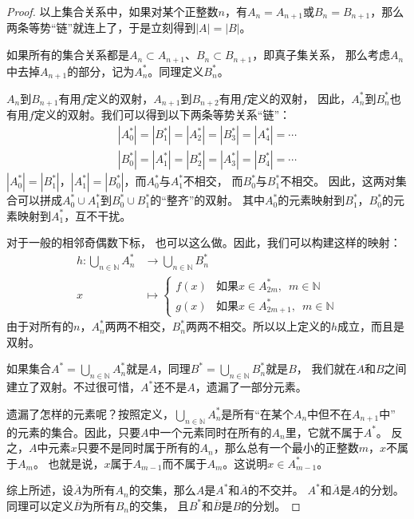 \documentclass[12pt,UTF8]{ctexbook}
\begin{document}
\begin{appendix}
\begin{proof}
    以上集合关系中，如果对某个正整数$n$，有$A_n = A_{n+1}$或$B_n = B_{n+1}$，那么两条等势“链”就连上了，于是立刻得到$|A| = |B|$。

    如果所有的集合关系都是$A_n \subset A_{n+1}$、$B_n \subset B_{n+1}$，即真子集关系，
    那么考虑$A_n$中去掉$A_{n+1}$的部分，记为$A_n^*$。同理定义$B_n^*$。
    
    $A_n$到$B_{n+1}$有用$f$定义的双射，$A_{n+1}$到$B_{n+2}$有用$f$定义的双射，
    因此，$A_n^*$到$B_n^*$也有用$f$定义的双射。我们可以得到以下两条等势关系“链”：
    \begin{align*}
        |A_0^*| = |B_1^*| = |A_2^*| = |B_3^*| = |A_4^*| = \cdots  \\
        |B_0^*| = |A_1^*| = |B_2^*| = |A_3^*| = |B_4^*| = \cdots   
    \end{align*}
    $|A_0^*| = |B_1^*|$，$|A_1^*| = |B_0^*|$，而$A_0^*$与$A_1^*$不相交，
    而$B_0^*$与$B_1^*$不相交。
    因此，这两对集合可以拼成$A_0^* \cup A_1^*$到$B_0^* \cup B_1^*$的“整齐”的双射。
    其中$A_0^*$的元素映射到$B_1^*$，$B_0^*$的元素映射到$A_1^*$，互不干扰。
    
    对于一般的相邻奇偶数下标，
    也可以这么做。因此，我们可以构建这样的映射：
    \begin{align*}
        h : \bigcup_{n\in\mathbb{N}} A_n^* &\rightarrow \bigcup_{n\in\mathbb{N}} B_n^*  \\
        x \quad&\mapsto \left\{ \begin{array}{ll}
            f(x) & \mbox{如果} x\in A_{2m}^*,\,\,\, m\in\mathbb{N}  \\
            g(x) & \mbox{如果} x\in A_{2m+1}^*,\,\,\, m\in\mathbb{N} 
        \end{array} \right.
    \end{align*}
    由于对所有的$n$，$A_n^*$两两不相交，$B_n^*$两两不相交。所以以上定义的$h$成立，而且是双射。

    如果集合$A^* = \bigcup_{n\in\mathbb{N}} A_n^*$就是$A$，同理$B^* = \bigcup_{n\in\mathbb{N}} B_n^*$就是$B$，
    我们就在$A$和$B$之间建立了双射。不过很可惜，$A^*$还不是$A$，遗漏了一部分元素。

    遗漏了怎样的元素呢？按照定义，$\bigcup_{n\in\mathbb{N}} A_n^*$是所有“在某个$A_n$中但不在$A_{n+1}$中”
    的元素的集合。因此，只要$A$中一个元素同时在所有的$A_n$里，它就不属于$A^*$。
    反之，$A$中元素$x$只要不是同时属于所有的$A_n$，那么总有一个最小的正整数$m$，$x$不属于$A_m$。
    也就是说，$x$属于$A_{m-1}$而不属于$A_m$。这说明$x\in A_{m-1}^*$。

    综上所述，设$\overline{A}$为所有$A_n$的交集，那么$A$是$A^*$和$\overline{A}$的不交并。
    $A^*$和$\overline{A}$是$A$的分划。同理可以定义$\overline{B}$为所有$B_n$的交集，
    且$B^*$和$\overline{B}$是$B$的分划。


\end{proof}
\end{appendix}
\end{document}
